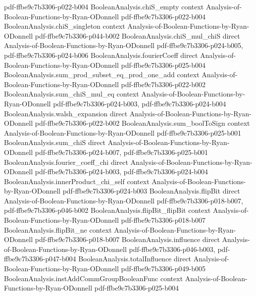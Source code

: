 \begin{lemma}
  {pdf-ffbe9c7b3306-p022-b004}
\proofstep
  {BooleanAnalysis.chiS_empty}
  {context}
  {Analysis-of-Boolean-Functions-by-Ryan-ODonnell}
  {pdf-ffbe9c7b3306-p022-b004}
\proofstep
  {BooleanAnalysis.chiS_singleton}
  {context}
  {Analysis-of-Boolean-Functions-by-Ryan-ODonnell}
  {pdf-ffbe9c7b3306-p044-b002}
\proofstep
  {BooleanAnalysis.chiS_mul_chiS}
  {direct}
  {Analysis-of-Boolean-Functions-by-Ryan-ODonnell}
  {pdf-ffbe9c7b3306-p024-b005,
    pdf-ffbe9c7b3306-p024-b006}
\proofstep
  {BooleanAnalysis.fourierCoeff}
  {direct}
  {Analysis-of-Boolean-Functions-by-Ryan-ODonnell}
  {pdf-ffbe9c7b3306-p025-b004}
\proofstep
  {BooleanAnalysis.sum_prod_subset_eq_prod_one_add}
  {context}
  {Analysis-of-Boolean-Functions-by-Ryan-ODonnell}
  {pdf-ffbe9c7b3306-p022-b002}
\proofstep
  {BooleanAnalysis.sum_chiS_mul_eq}
  {context}
  {Analysis-of-Boolean-Functions-by-Ryan-ODonnell}
  {pdf-ffbe9c7b3306-p024-b003,
    pdf-ffbe9c7b3306-p024-b004}
\proofstep
  {BooleanAnalysis.walsh_expansion}
  {direct}
  {Analysis-of-Boolean-Functions-by-Ryan-ODonnell}
  {pdf-ffbe9c7b3306-p022-b002}
\proofstep
  {BooleanAnalysis.sum_boolToSign}
  {context}
  {Analysis-of-Boolean-Functions-by-Ryan-ODonnell}
  {pdf-ffbe9c7b3306-p025-b001}
\proofstep
  {BooleanAnalysis.sum_chiS}
  {direct}
  {Analysis-of-Boolean-Functions-by-Ryan-ODonnell}
  {pdf-ffbe9c7b3306-p024-b007,
    pdf-ffbe9c7b3306-p025-b001}
\proofstep
  {BooleanAnalysis.fourier_coeff_chi}
  {direct}
  {Analysis-of-Boolean-Functions-by-Ryan-ODonnell}
  {pdf-ffbe9c7b3306-p024-b003,
    pdf-ffbe9c7b3306-p024-b004}
\proofstep
  {BooleanAnalysis.innerProduct_chi_self}
  {context}
  {Analysis-of-Boolean-Functions-by-Ryan-ODonnell}
  {pdf-ffbe9c7b3306-p024-b003}
\proofstep
  {BooleanAnalysis.flipBit}
  {direct}
  {Analysis-of-Boolean-Functions-by-Ryan-ODonnell}
  {pdf-ffbe9c7b3306-p018-b007,
    pdf-ffbe9c7b3306-p046-b002}
\proofstep
  {BooleanAnalysis.flipBit_flipBit}
  {context}
  {Analysis-of-Boolean-Functions-by-Ryan-ODonnell}
  {pdf-ffbe9c7b3306-p018-b007}
\proofstep
  {BooleanAnalysis.flipBit_ne}
  {context}
  {Analysis-of-Boolean-Functions-by-Ryan-ODonnell}
  {pdf-ffbe9c7b3306-p018-b007}
\proofstep
  {BooleanAnalysis.influence}
  {direct}
  {Analysis-of-Boolean-Functions-by-Ryan-ODonnell}
  {pdf-ffbe9c7b3306-p046-b003,
    pdf-ffbe9c7b3306-p047-b004}
\proofstep
  {BooleanAnalysis.totalInfluence}
  {direct}
  {Analysis-of-Boolean-Functions-by-Ryan-ODonnell}
  {pdf-ffbe9c7b3306-p049-b005}
\proofstep
  {BooleanAnalysis.instAddCommGroupBooleanFunc}
  {context}
  {Analysis-of-Boolean-Functions-by-Ryan-ODonnell}
  {pdf-ffbe9c7b3306-p025-b004}

\end{lemma}
